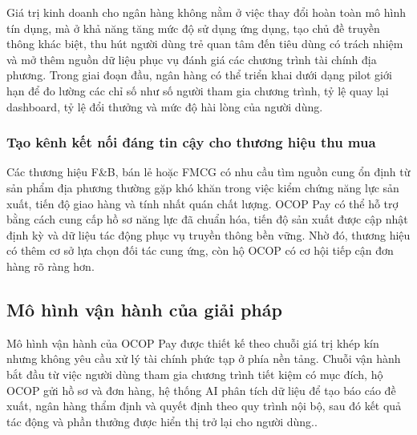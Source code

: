 \documentclass[13pt,a4paper]{extarticle}
\begin{document}
Giá trị kinh doanh cho ngân hàng không nằm ở việc thay đổi hoàn toàn mô hình tín dụng, mà ở khả năng tăng mức độ sử dụng ứng dụng, tạo chủ đề truyền thông khác biệt, thu hút người dùng trẻ quan tâm đến tiêu dùng có trách nhiệm và mở thêm nguồn dữ liệu phục vụ đánh giá các chương trình tài chính địa phương. Trong giai đoạn đầu, ngân hàng có thể triển khai dưới dạng pilot giới hạn để đo lường các chỉ số như số người tham gia chương trình, tỷ lệ quay lại dashboard, tỷ lệ đổi thưởng và mức độ hài lòng của người dùng.


\subsubsection{Tạo kênh kết nối đáng tin cậy cho thương hiệu thu mua}

Các thương hiệu F\&B, bán lẻ hoặc FMCG có nhu cầu tìm nguồn cung ổn định từ sản phẩm địa phương thường gặp khó khăn trong việc kiểm chứng năng lực sản xuất, tiến độ giao hàng và tính nhất quán chất lượng. OCOP Pay có thể hỗ trợ bằng cách cung cấp hồ sơ năng lực đã chuẩn hóa, tiến độ sản xuất được cập nhật định kỳ và dữ liệu tác động phục vụ truyền thông bền vững. Nhờ đó, thương hiệu có thêm cơ sở lựa chọn đối tác cung ứng, còn hộ OCOP có cơ hội tiếp cận đơn hàng rõ ràng hơn.


\subsection{Mô hình vận hành của giải pháp}

Mô hình vận hành của OCOP Pay được thiết kế theo chuỗi giá trị khép kín nhưng không yêu cầu xử lý tài chính phức tạp ở phía nền tảng. Chuỗi vận hành bắt đầu từ việc người dùng tham gia chương trình tiết kiệm có mục đích, hộ OCOP gửi hồ sơ và đơn hàng, hệ thống AI phân tích dữ liệu để tạo báo cáo đề xuất, ngân hàng thẩm định và quyết định theo quy trình nội bộ, sau đó kết quả tác động và phần thưởng được hiển thị trở lại cho người dùng..
\end{document}

